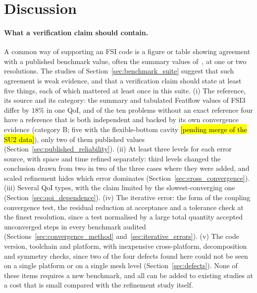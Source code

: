 \section{Discussion}\label{sec:discussion}

\paragraph{What a verification claim should contain.}
A common way of supporting an FSI code is a figure or table showing agreement with a published benchmark value, often the summary values of~\citet{Turek2006}, at one or two resolutions.
The studies of Section~\ref{sec:benchmark_suite} suggest that such agreement is weak evidence, and that a verification claim should state at least five things, each of which mattered at least once in this suite.
(i) The reference, its source and its category: the summary and tabulated Featflow values of FSI3 differ by $18\%$ in one QoI, and of the ten problems without an exact reference four have a reference that is both independent and backed by its own convergence evidence (category B; five with the flexible-bottom cavity \hl{[pending merge of the SU2 data]}), only two of them published values (Section~\ref{sec:published_reliability}).
(ii) At least three levels for each error source, with space and time refined separately: third levels changed the conclusion drawn from two in two of the three cases where they were added, and scaled refinement hides which error dominates (Section~\ref{sec:cross_convergence}).
(iii) Several QoI types, with the claim limited by the slowest-converging one (Section~\ref{sec:qoi_dependence}).
(iv) The iterative error: the form of the coupling convergence test, the residual reduction at acceptance and a tolerance check at the finest resolution, since a test normalised by a large total quantity accepted unconverged steps in every benchmark audited (Sections~\ref{sec:convergence_method} and~\ref{sec:iterative_errors}).
(v) The code version, toolchain and platform, with inexpensive cross-platform, decomposition and symmetry checks, since two of the four defects found here could not be seen on a single platform or on a single mesh level (Section~\ref{sec:defects}).
None of these items requires a new benchmark, and all can be added to existing studies at a cost that is small compared with the refinement study itself.


